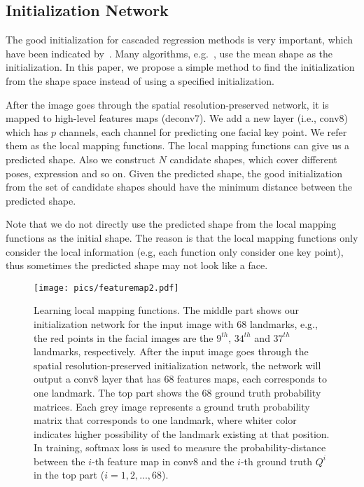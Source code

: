 \documentclass[journal]{IEEEtran}
\begin{document}
\subsection{Initialization Network}
The good initialization for cascaded regression methods is very important, which have been indicated by~\cite{cfss,smith2014nonparametric}. Many algorithms, e.g.~\cite{sdm}, use the mean shape as the initialization. In this paper, we propose a simple method to find the initialization from the shape space instead of using a specified initialization.

After the image goes through the spatial resolution-preserved network, it is mapped to high-level features maps (deconv7).  We add a new layer (i.e., conv8) which has $p$ channels, each channel for predicting one facial key point. We refer them as the local mapping functions. The local mapping functions can give us a predicted shape. Also we construct $N$ candidate shapes, which cover different poses, expression and so on. Given the predicted shape, the good initialization from the set of candidate shapes should have the minimum distance between the predicted shape.

Note that we do not directly use the predicted shape from the local mapping functions as the initial shape. The reason is that the local mapping functions only consider the local information (e.g, each function only consider one key point), thus sometimes the predicted shape may not look like a face.


\begin{figure}[t]
\centering
    \texttt{[image: pics/featuremap2.pdf]}
  \caption{Learning local mapping functions. The middle part shows our initialization network for the input image with 68 landmarks, e.g., the red points in the facial images are the $9^{th}$, $34^{th}$ and $37^{th}$ landmarks, respectively. After the input image goes through the spatial resolution-preserved initialization network, the network will output a conv8 layer that has 68 features maps, each corresponds to one landmark. The top part shows the 68 ground truth probability matrices. Each grey image represents a ground truth probability matrix that corresponds to one landmark, where whiter color indicates higher possibility of the landmark existing at that position. In training, softmax loss is used to measure the probability-distance between the $i$-th feature map in conv8 and the $i$-th ground truth $Q^i$ in the top part ($i=1,2,...,68$). }
  \label{local_mapping}  %
\end{figure}
\end{document}
